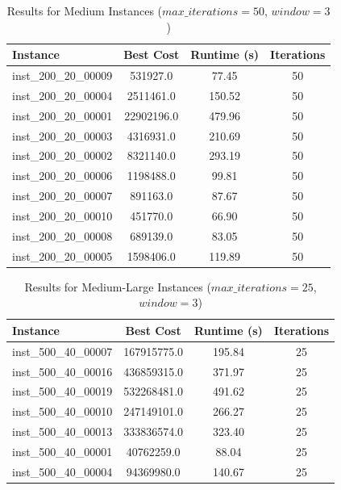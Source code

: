 \documentclass{article}
\begin{document}
\begin{table}[ht]
\centering
\caption{Results for Medium Instances ($max\_iterations=50$, $window=3$)}
\begin{tabular}{lccc}
\toprule
\textbf{Instance} & \textbf{Best Cost} & \textbf{Runtime (s)} & \textbf{Iterations} \\
\midrule
inst\_200\_20\_00009 & 531927.0   & 77.45  & 50 \\
inst\_200\_20\_00004 & 2511461.0  & 150.52 & 50 \\
inst\_200\_20\_00001 & 22902196.0 & 479.96 & 50 \\
inst\_200\_20\_00003 & 4316931.0  & 210.69 & 50 \\
inst\_200\_20\_00002 & 8321140.0  & 293.19 & 50 \\
inst\_200\_20\_00006 & 1198488.0  & 99.81  & 50 \\
inst\_200\_20\_00007 & 891163.0   & 87.67  & 50 \\
inst\_200\_20\_00010 & 451770.0   & 66.90  & 50 \\
inst\_200\_20\_00008 & 689139.0   & 83.05  & 50 \\
inst\_200\_20\_00005 & 1598406.0  & 119.89 & 50 \\
\bottomrule
\end{tabular}
\label{tab:results_200_20}
\end{table}

\begin{table}[H]
\centering
\caption{Results for Medium-Large Instances ($max\_iterations=25$, $window=3$)}
\begin{tabular}{lccc}
\toprule
\textbf{Instance} & \textbf{Best Cost} & \textbf{Runtime (s)} & \textbf{Iterations} \\
\midrule
inst\_500\_40\_00007 & 167915775.0  & 195.84 & 25 \\
inst\_500\_40\_00016 & 436859315.0  & 371.97 & 25 \\
inst\_500\_40\_00019 & 532268481.0  & 491.62 & 25 \\
inst\_500\_40\_00010 & 247149101.0  & 266.27 & 25 \\
inst\_500\_40\_00013 & 333836574.0  & 323.40 & 25 \\
inst\_500\_40\_00001 & 40762259.0   & 88.04  & 25 \\
inst\_500\_40\_00004 & 94369980.0   & 140.67 & 25 \\
\bottomrule
\end{tabular}
\label{tab:results_500_40}
\end{table}
\end{document}
